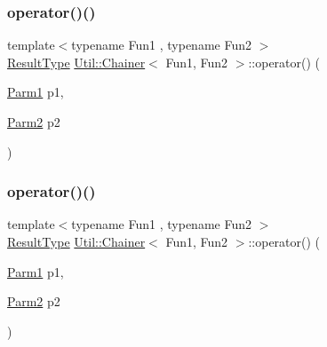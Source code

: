 \mbox{\label{classUtil_1_1Chainer_af5e43ed56a289b68e7704727ef552208}} 
\subsubsection{\texorpdfstring{operator()()}{operator()()}\hspace{0.1cm}{\footnotesize\ttfamily [5/12]}}
{\footnotesize\ttfamily template$<$typename Fun1 , typename Fun2 $>$ \\
\mbox{\hyperlink{classUtil_1_1Chainer_a2c8d88a77b8ba93eb915dc799ddafbb9}{Result\+Type}} \mbox{\hyperlink{classUtil_1_1Chainer}{Util\+::\+Chainer}}$<$ Fun1, Fun2 $>$\+::operator() (\begin{DoxyParamCaption}\item[{\mbox{\hyperlink{classUtil_1_1Chainer_a3e09b2267dabdd8d12070b09c47749c6}{Parm1}}}]{p1,  }\item[{\mbox{\hyperlink{classUtil_1_1Chainer_a1bfb0e8f35679278c85d232a74a107ff}{Parm2}}}]{p2 }\end{DoxyParamCaption})\hspace{0.3cm}{\ttfamily [inline]}}

\mbox{\label{classUtil_1_1Chainer_af5e43ed56a289b68e7704727ef552208}} 
\subsubsection{\texorpdfstring{operator()()}{operator()()}\hspace{0.1cm}{\footnotesize\ttfamily [6/12]}}
{\footnotesize\ttfamily template$<$typename Fun1 , typename Fun2 $>$ \\
\mbox{\hyperlink{classUtil_1_1Chainer_a2c8d88a77b8ba93eb915dc799ddafbb9}{Result\+Type}} \mbox{\hyperlink{classUtil_1_1Chainer}{Util\+::\+Chainer}}$<$ Fun1, Fun2 $>$\+::operator() (\begin{DoxyParamCaption}\item[{\mbox{\hyperlink{classUtil_1_1Chainer_a3e09b2267dabdd8d12070b09c47749c6}{Parm1}}}]{p1,  }\item[{\mbox{\hyperlink{classUtil_1_1Chainer_a1bfb0e8f35679278c85d232a74a107ff}{Parm2}}}]{p2 }\end{DoxyParamCaption})\hspace{0.3cm}{\ttfamily [inline]}}

